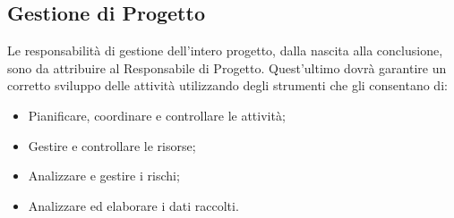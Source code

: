 \subsection{Gestione di Progetto}
Le responsabilità di gestione dell’intero progetto, dalla nascita alla conclusione, sono da
attribuire al Responsabile di Progetto.
Quest’ultimo dovrà garantire un corretto sviluppo delle attività utilizzando degli strumenti che gli consentano di:
\begin{itemize}
\item Pianificare, coordinare e controllare le attività;
\item Gestire e controllare le risorse;
\item Analizzare e gestire i rischi;
\item Analizzare ed elaborare i dati raccolti.
\end{itemize}

\label{}

%
%
%
%
%
%

